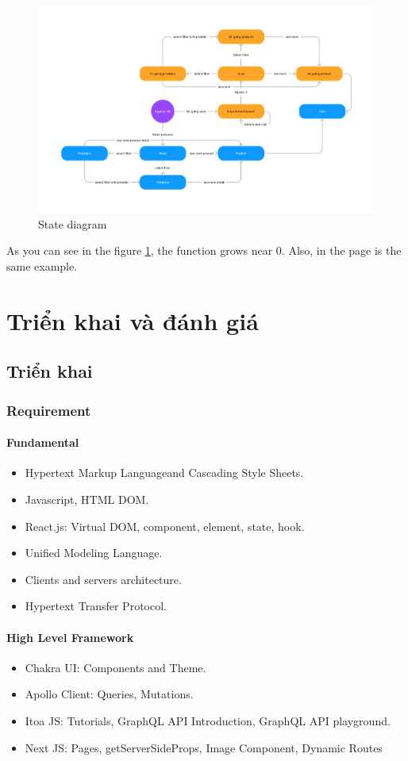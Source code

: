 \documentclass{report}
\begin{document}
\begin{figure}[h!]
	\centering
	\includegraphics[width=\textwidth]{./images/state.png}
	\caption{State diagram}
	\label{fig:state}
\end{figure}
As you can see in the figure \ref{fig:state}, the function grows near 0. Also, in the page \pageref{fig:state} is the same example.\pageref{fig:state}


\part{Triển khai và đánh giá}
\chapter{Triển khai}
\section{Requirement}
\subsection{Fundamental}
\begin{itemize}
	\item Hypertext Markup Languageand Cascading Style Sheets.
	\item Javascript, HTML DOM.
  	\item React.js: Virtual DOM, component, element, state, hook.
	\item Unified Modeling Language.
	\item Clients and servers architecture.
	\item Hypertext Transfer Protocol.
\end{itemize}

\subsection{High Level Framework}
\begin{itemize}
\item Chakra UI: Components and Theme.
\item Apollo Client: Queries, Mutations.
\item Itoa JS: Tutorials, GraphQL API Introduction, GraphQL API playground.
\item Next JS: Pages, getServerSideProps, Image Component, Dynamic Routes
\end{itemize}
\end{document}

